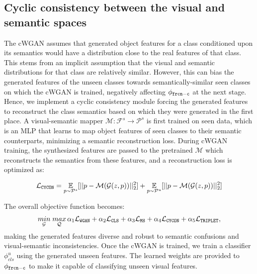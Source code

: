 \documentclass{bmvc2k}
\begin{document}
\subsection{Cyclic consistency between the visual and semantic spaces}
\label{sec:cyc-con}
The cWGAN assumes that generated object features for a class conditioned upon its semantics would have a distribution close to the real features of that class. This stems from an implicit assumption that the visual and semantic distributions for that class are relatively similar. However, this can bias the generated features of the unseen classes towards semantically-similar seen classes on which the cWGAN is trained, negatively affecting $\phi_{\tt frcn-c}$ at the next stage. 
Hence, we implement a cyclic consistency module forcing the generated features to reconstruct the class semantics based on which they were generated in the first place. A visual-semantic mapper $\mathcal{M}: \mathcal{F}^s \longrightarrow \mathcal{P}^s$ is first trained on seen data, which is an MLP that learns to map object features of seen classes to their semantic counterparts, minimizing a semantic reconstruction loss.
During cWGAN training, the synthesized features are passed to the pretrained $\mathcal{M}$ which reconstructs the semantics from these features, and a reconstruction loss is optimized as:

\begin{align}
	\label{eq:cycon}
	\mathcal{L}_{\tt CYCON} =  \underset{p \sim \mathcal{P}^s}{\mathbb{E}}[|| p - \mathcal{M}(\mathcal{G}(z, p)) ||_2^2] 
	+ 
	\underset{p \sim \mathcal{P}^u}{\mathbb{E}}[|| p - \mathcal{M}(\mathcal{G}(z, p)) ||_2^2]
\end{align}

The overall objective function becomes:
\begin{align}
	\label{eq:total_loss}
	\underset{\mathcal{G}}{min} \; \underset{\mathcal{Q}}{max} \, \alpha_1 \mathcal{L}_{\tt WGAN} + \alpha_2 \mathcal{L}_{\tt CLS} + \alpha_3 \mathcal{L}_{\tt MS} + \alpha_4 \mathcal{L}_{\tt CYCON} + \alpha_5 \mathcal{L}_{\tt TRIPLET},
\end{align}
making the generated features diverse and robust to semantic confusions and visual-semantic inconsistencies. Once the cWGAN is trained, we train a classifier $\phi_{cls}^{u}$ using the generated unseen features. The learned weights are provided to $\phi_{\tt frcn-c}$ to make it capable of classifying unseen visual features.
\end{document}
